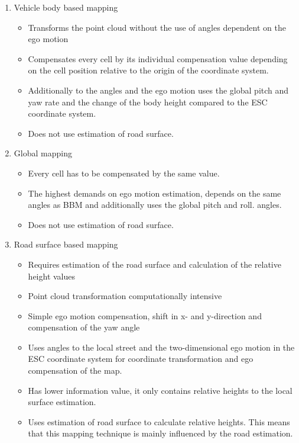 \begin{enumerate}
\item Vehicle body based mapping
\begin{itemize}
\item Transforms the point cloud without the use of angles dependent on the ego motion
\item Compensates every cell by its individual compensation value depending on the cell position relative to the origin of the coordinate system.
\item Additionally to the angles and the ego motion uses the global pitch and yaw rate and the change of the body height compared to the ESC coordinate system.
\item Does not use estimation of road surface.
\end{itemize}

\item Global mapping
\begin{itemize}
\item Every cell has to be compensated by the same value.
\item The highest demands on ego motion estimation, depends on the same angles as BBM and additionally uses the global pitch and roll. angles.
\item Does not use estimation of road surface.
\end{itemize}


\item Road surface based mapping
\begin{itemize}
\item Requires estimation of the road surface and calculation of the relative height values
\item Point cloud transformation computationally intensive
\item Simple ego motion compensation, shift in x- and y-direction and compensation of the yaw angle
\item Uses angles to the local street and the two-dimensional ego motion in the ESC coordinate system  for coordinate transformation and ego compensation of the map.
\item Has lower information value, it only contains relative heights to the local surface estimation. 
\item Uses estimation of road surface to calculate relative heights. This means that this mapping technique is mainly influenced by the road estimation.
\end{itemize}
\end{enumerate}

